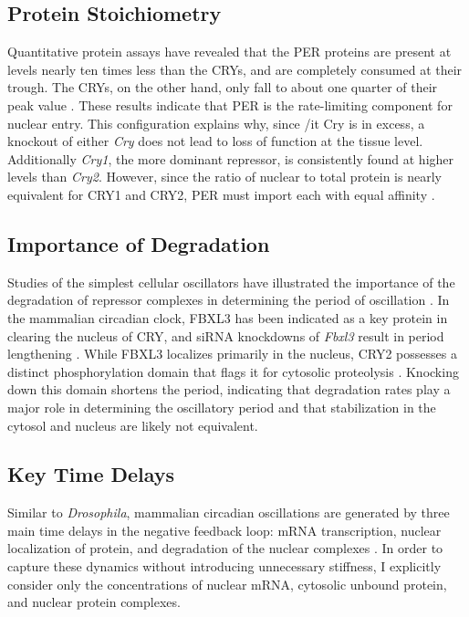 \subsection{Protein Stoichiometry} Quantitative protein assays have revealed that the PER proteins are present at levels nearly ten times less than the CRYs, and are completely consumed at their trough. The CRYs, on the other hand, only fall to about one quarter of their peak value  \cite{Lee2001}. These results indicate that PER is the rate-limiting component for nuclear entry. This configuration explains why, since {/it Cry} is in excess, a knockout of either {\it Cry} does not lead to loss of function at the tissue level. Additionally {\it Cry1}, the more dominant repressor, is consistently found at higher levels than {\it Cry2}. However, since the ratio of nuclear to total protein is nearly equivalent for CRY1 and CRY2, PER must import each with equal affinity \cite{Lee2001,Lee2011b}.

\subsection{Importance of Degradation} Studies of the simplest cellular oscillators have illustrated the importance of the degradation of repressor complexes in determining the period of oscillation \cite{Cookson2009}. In the mammalian circadian clock, FBXL3 has been indicated as a key protein in clearing the nucleus of CRY, and siRNA knockdowns of {\it Fbxl3} result in period lengthening \cite{Zhang2009}. While FBXL3 localizes primarily in the nucleus, CRY2 possesses a distinct phosphorylation domain that flags it for cytosolic proteolysis \cite{Kurabayashi2010}. Knocking down this domain shortens the period, indicating that degradation rates play a major role in determining the oscillatory period and that stabilization in the cytosol and nucleus are likely not equivalent.

\subsection{Key Time Delays} Similar to {\it Drosophila}, mammalian circadian oscillations are generated by three main time delays in the negative feedback loop: mRNA transcription, nuclear localization of protein, and degradation of the nuclear complexes \cite{Vielhaber2000a}. In order to capture these dynamics without introducing unnecessary stiffness, I explicitly consider only the concentrations of nuclear mRNA, cytosolic unbound protein, and nuclear protein complexes.

